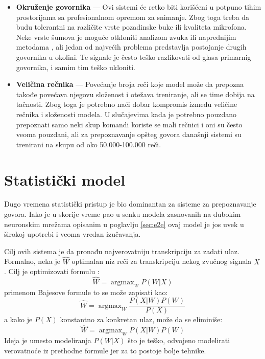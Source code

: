 \documentclass[a4paper]{article}
\DeclareMathOperator*{\argmax}{argmax}
\begin{document}
\begin{itemize}
  \item \textbf{Okruženje govornika} --- 
  Ovi sistemi će retko biti korišćeni u potpuno tihim prostorijama sa profesionalnom opremom za snimanje. Zbog toga treba da budu tolerantni na različite vrste pozadinske buke ili kvaliteta mikrofona. 
  Neke vrste šumova je moguće otkloniti analizom zvuka ili naprednijim metodama \cite{xu2015enhancement}, ali jedan od najvećih problema predstavlja postojanje drugih govornika u okolini.
  Te signale je često teško razlikovati od glasa primarnig govornika, i samim tim teško ukloniti.
  
  \item \textbf{Veličina rečnika} --- 
  Povećanje broja reči koje model može da prepozna takođe povećava njegovu složenost i otežava treniranje, ali se time dobija na tačnosti. 
  Zbog toga je potrebno naći dobar kompromis između veličine rečnika i složenosti modela. 
  U slučajevima kada je potrebno pouzdano prepoznati samo neki skup komandi koriste se mali rečnici i oni su često veoma pouzdani, ali za prepoznavanje opšteg govora današnji sistemi su trenirani na skupu od oko 50.000-100.000 reči.
\end{itemize}

\section{Statistički model}
\label{sec:statistical}

Dugo vremena statistički pristup je bio dominantan za sisteme za prepoznavanje govora.
Iako je u skorije vreme pao u senku modela zasnovanih na dubokim neuronskim mrežama opisanim u poglavlju \ref{sec:e2e} ovaj model je jos uvek u širokoj upotrebi i veoma vredan izučavanja.

Cilj ovih sistema je da pronađu najverovatniju transkripciju za zadati ulaz.
Formalno, neka je $\hat{W}$ optimalan niz reči za transkripciju nekog zvučnog signala $X$. Cilj je optimizovati formulu \cite{kamath2019nlp}:
\begin{equation*}
  \hat{W} = \argmax_{W} P(W|X)
\end{equation*}
primenom Bajesove formule to se može zapisati kao:
\begin{equation*}
  \hat{W} = \argmax_{W} \frac{P(X|W) P(W)}{P(X)}
\end{equation*}
a kako je $P(X)$ konstantno za konkretan ulaz, može da se eliminiše:
\begin{equation}
  \label{eq:stat1}
  \hat{W} = \argmax_{W} P(X|W) P(W)
\end{equation}
Ideja je umesto modeliranja $P(W|X)$ što je teško, odvojeno modelirati verovatnoće iz prethodne formule jer za to postoje bolje tehnike.
\end{document}
